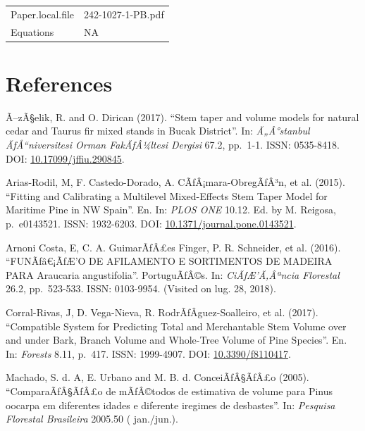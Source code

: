 \documentclass[]{article}
\begin{document}
\begin{longtable}[]{@{}ll@{}}
\begin{minipage}[t]{0.21\columnwidth}\raggedright
Paper.local.file\strut
\end{minipage} & \begin{minipage}[t]{0.73\columnwidth}\raggedright
242-1027-1-PB.pdf\strut
\end{minipage}\tabularnewline
\begin{minipage}[t]{0.21\columnwidth}\raggedright
Equations\strut
\end{minipage} & \begin{minipage}[t]{0.73\columnwidth}\raggedright
NA\strut
\end{minipage}\tabularnewline
\bottomrule
\end{longtable}

\clearpage

\hypertarget{references}{%
\section{References}\label{references}}

Ã--zÃ§elik, R. and O. Dirican (2017). ``Stem taper and volume models for
natural cedar and Taurus fir mixed stands in Bucak District''. In:
\emph{Ã„Â°stanbul ÃƒÅ``niversitesi Orman FakÃƒÂ¼ltesi Dergisi} 67.2,
pp.~1-1. ISSN: 0535-8418. DOI:
\href{https://doi.org/10.17099/jffiu.290845}{10.17099/jffiu.290845}.

Arias-Rodil, M, F. Castedo-Dorado, A. CÃƒÂ¡mara-ObregÃƒÂ³n, et al.
(2015). ``Fitting and Calibrating a Multilevel Mixed-Effects Stem Taper
Model for Maritime Pine in NW Spain''. En. In: \emph{PLOS ONE} 10.12.
Ed. by M. Reigosa, p.~e0143521. ISSN: 1932-6203. DOI:
\href{https://doi.org/10.1371/journal.pone.0143521}{10.1371/journal.pone.0143521}.

Arnoni Costa, E, C. A. GuimarÃƒÂ£es Finger, P. R. Schneider, et al.
(2016). ``FUNÃƒâ€¡ÃƒÆ'O DE AFILAMENTO E SORTIMENTOS DE MADEIRA PARA
Araucaria angustifolia''. PortuguÃƒÂ©s. In: \emph{CiÃƒÆ'Ã‚Âªncia
Florestal} 26.2, pp.~523-533. ISSN: 0103-9954. (Visited on lug. 28,
2018).

Corral-Rivas, J, D. Vega-Nieva, R. RodrÃƒÂ­guez-Soalleiro, et al.
(2017). ``Compatible System for Predicting Total and Merchantable Stem
Volume over and under Bark, Branch Volume and Whole-Tree Volume of Pine
Species''. En. In: \emph{Forests} 8.11, p.~417. ISSN: 1999-4907. DOI:
\href{https://doi.org/10.3390/f8110417}{10.3390/f8110417}.

Machado, S. d. A, E. Urbano and M. B. d. ConceiÃƒÂ§ÃƒÂ£o (2005).
``ComparaÃƒÂ§ÃƒÂ£o de mÃƒÂ©todos de estimativa de volume para Pinus
oocarpa em diferentes idades e diferente iregimes de desbastes''. In:
\emph{Pesquisa Florestal Brasileira} 2005.50 ( jan./jun.).
\end{document}
